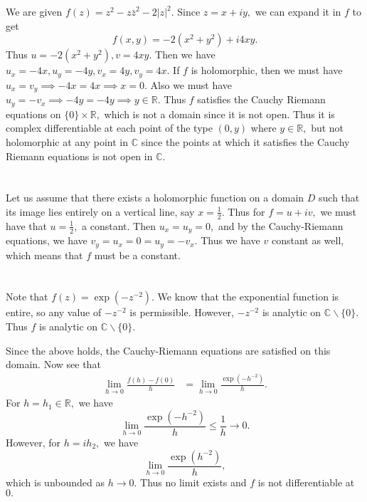 \documentclass{article}
\title{} %
\author{Gandhar Kulkarni (mmat2304)} %
\date{} %
\begin{document}
\maketitle %


\section{} %
We are given $f(z)=z^2-z\bar{z}^2-2|z|^2.$ Since $z=x+iy,$ we can expand it in $f$ to get 
$$f(x,y)=-2(x^2+y^2)+i4xy.$$ Thus $u=-2(x^2+y^2),v=4xy.$ Then we have $u_x=-4x,u_y=-4y,v_x=4y,v_y=4x.$
If $f$ is holomorphic, then we must have $u_x=v_y \implies -4x=4x \implies x=0.$ Also we must have $u_y=-v_x \implies -4y=-4y \implies y \in \mathbb{R}.$
Thus $f$ satisfies the Cauchy Riemann equations on $\{0\} \times \mathbb{R},$ which is not a domain since it is not open. Thus it is complex differentiable 
at each point of the type $(0,y)$ where $y \in \mathbb{R},$ but not holomorphic at any point in $\mathbb{C}$ since the points at which it satisfies the 
Cauchy Riemann equations is not open in $\mathbb{C}.$ 
\section{} %
Let us assume that there exists a holomorphic function on a domain $D$ such that its image lies entirely on a vertical line, say $x=\frac{1}{2}$.
Thus for $f=u+iv,$ we must have that $u=\frac{1}{2},$ a constant. Then $u_x=u_y=0,$ and by the Cauchy-Riemann equations, we have $v_y=u_x=0=u_y=-v_x.$ Thus 
we have $v$ constant as well, which means that $f$ must be a constant.  
\section{} %
Note that $f(z)=\exp (-z^{-2}).$ We know that the exponential function is entire, so any value of $-z^{-2}$ is permissible. However, $-z^{-2}$ is analytic 
on $\mathbb{C} \backslash \{0\}.$ Thus $f$ is analytic on $\mathbb{C}\backslash\{0\}.$ 

Since the above holds, the Cauchy-Riemann equations are satisfied on this domain. Now see that 
\begin{align*}
	\lim_{h \to 0} \frac{f(h)-f(0)}{h} &= \lim_{h \to 0} \frac{\exp(-h^{-2})}{h}.
\end{align*}
For $h=h_1 \in \mathbb{R},$ we have $$\lim_{h \to 0} \frac{\exp(-h^{-2})}{h} \leq \frac{1}{h} \to 0. $$
However, for $h=ih_2,$ we have $$\lim_{h \to 0} \frac{\exp(h^{-2})}{h},$$ which is unbounded as $h \to 0.$
Thus no limit exists and $f$ is not differentiable at $0.$
\end{document}

